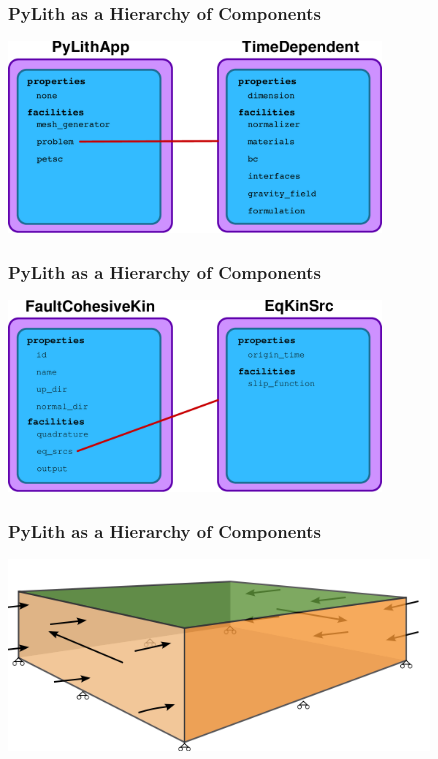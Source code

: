 \documentclass{beamer}
\begin{document}
\begin{frame}
  \frametitle{PyLith as a Hierarchy of Components}

  \vfill
  \begin{center}
    \includegraphics[height=2.0in]{figs/pylithapp}
  \end{center}  
  \vfill

\end{frame}


\begin{frame}
  \frametitle{PyLith as a Hierarchy of Components}

  \vfill
  \begin{center}
    \includegraphics[height=2.0in]{figs/faultcohesivekin}
  \end{center}  
  \vfill

\end{frame}


\begin{frame}
  \frametitle{PyLith as a Hierarchy of Components}

  \vfill
  \begin{center}
    \includegraphics[height=2.0in]{figs/step01_diagram}
  \end{center}  
  \vfill

\end{frame}
\end{document}
